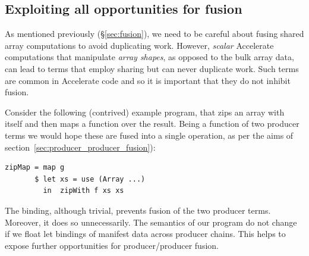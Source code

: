 \subsection{Exploiting all opportunities for fusion}
\label{sec:binder_elimination}


As mentioned previously (\S\ref{sec:fusion}), we need to be careful about fusing
shared array computations to avoid duplicating work. However, \emph{scalar}
Accelerate computations that manipulate \emph{array shapes}, as opposed to the
bulk array data, can lead to terms that employ sharing but can never duplicate
work. Such terms are common in Accelerate code and so it is important that they
do not inhibit fusion.

Consider the following (contrived) example program, that zips an array with
itself and then maps a function over the result. Being a function of two
producer terms we would hope these are fused into a single operation, as per the
aims of section~\ref{sec:producer_producer_fusion}):
%
\begin{lstlisting}[style=haskell]
zipMap = map g
       $ let xs = use (Array ...)
         in  zipWith f xs xs
\end{lstlisting}
%
The binding, although trivial, prevents fusion of the two producer terms.
Moreover, it does so unnecessarily. The semantics of our program do not change
if we float let bindings of manifest data across producer chains. This helps to
expose further opportunities for producer/producer fusion.

